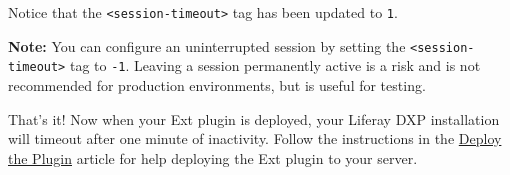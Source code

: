 Notice that the \texttt{\textless{}session-timeout\textgreater{}} tag
has been updated to \texttt{1}.

\noindent\hrulefill

\textbf{Note:} You can configure an uninterrupted session by setting the
\texttt{\textless{}session-timeout\textgreater{}} tag to \texttt{-1}.
Leaving a session permanently active is a risk and is not recommended
for production environments, but is useful for testing.

\noindent\hrulefill

That's it! Now when your Ext plugin is deployed, your Liferay DXP
installation will timeout after one minute of inactivity. Follow the
instructions in the
\href{/docs/7-2/customization/-/knowledge_base/c/deploying-an-ext-plugin}{Deploy
the Plugin} article for help deploying the Ext plugin to your server.
